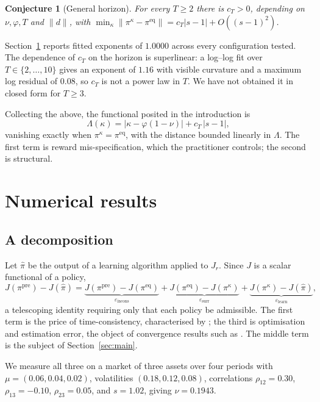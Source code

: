 \documentclass[11pt,a4paper]{article}
\theoremstyle{plain}
\newtheorem{conjecture}[theorem]{Conjecture}
\theoremstyle{definition}
\theoremstyle{remark}
\newcommand{\pipre}{\pi^{\mathrm{pre}}}
\newcommand{\pieq}{\pi^{\mathrm{eq}}}
\newcommand{\pir}{\pi^{\kappa}}
\newcommand{\pihat}{\widehat{\pi}}
\newcommand{\epsincons}{\varepsilon_{\mathrm{incons}}}
\newcommand{\epssurr}{\varepsilon_{\mathrm{surr}}}
\newcommand{\epslearn}{\varepsilon_{\mathrm{learn}}}
\begin{document}
\begin{conjecture}[General horizon]\label{conj}
For every $T\ge2$ there is $c_T>0$, depending on $\nu,\varphi,T$ and $\|d\|$,
with $\min_{\kappa}\|\pir-\pieq\|=c_T|s-1|+O((s-1)^2)$.
\end{conjecture}

Section~\ref{sec:numerics} reports fitted exponents of $1.0000$ across every
configuration tested. The dependence of $c_T$ on the horizon is superlinear: a
log--log fit over $T\in\{2,\dots,10\}$ gives an exponent of $1.16$ with visible
curvature and a maximum log residual of $0.08$, so $c_T$ is not a power law in
$T$. We have not obtained it in closed form for $T\ge3$.

Collecting the above, the functional posited in the introduction is
\begin{equation}
\Lambda(\kappa)=\bigl|\kappa-\varphi(1-\nu)\bigr|+c_T\,|s-1| ,
\label{eq:lambda}
\end{equation}
vanishing exactly when $\pir=\pieq$, with the distance bounded linearly in
$\Lambda$. The first term is reward mis-specification, which the practitioner
controls; the second is structural.

\section{Numerical results}\label{sec:numerics}

\subsection{A decomposition}

Let $\pihat$ be the output of a learning algorithm applied to $J_r$. Since $J$ is
a scalar functional of a policy,
\begin{equation}
J(\pipre)-J(\pihat)
=\underbrace{J(\pipre)-J(\pieq)}_{\epsincons}
+\underbrace{J(\pieq)-J(\pir)}_{\epssurr}
+\underbrace{J(\pir)-J(\pihat)}_{\epslearn},
\label{eq:decomp}
\end{equation}
a telescoping identity requiring only that each policy be admissible. The first
term is the price of time-consistency, characterised by \citet{basak}; the third
is optimisation and estimation error, the object of convergence results such as
\citet{xiong}. The middle term is the subject of Section~\ref{sec:main}.

We measure all three on a market of three assets over four periods with
$\mu=(0.06,0.04,0.02)$, volatilities $(0.18,0.12,0.08)$, correlations
$\rho_{12}=0.30$, $\rho_{13}=-0.10$, $\rho_{23}=0.05$, and $s=1.02$, giving
$\nu=0.1943$.
\end{document}
